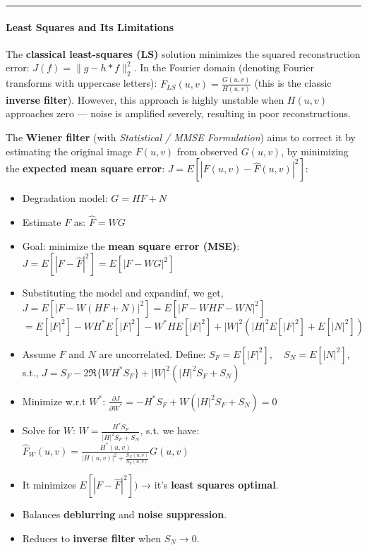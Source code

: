 \documentclass[11pt]{article}
\providecommand{\tightlist}{%
      \setlength{\itemsep}{0pt}\setlength{\parskip}{0pt}}
\begin{document}
\begin{center}\rule{0.5\linewidth}{0.5pt}\end{center}

\hypertarget{least-squares-and-its-limitations}{%
\paragraph{\texorpdfstring{\textbf{Least Squares and Its
Limitations}}{Least Squares and Its Limitations}}\label{least-squares-and-its-limitations}}

The \textbf{classical least-squares (LS)} solution minimizes the squared
reconstruction error: \(J(f) = \| g - h * f \|_2^2\). In the Fourier
domain (denoting Fourier transforms with uppercase letters):
\(F_{LS}(u,v) = \frac{G(u,v)}{H(u,v)}\) (this is the classic
\textbf{inverse filter}). However, this approach is highly unstable when
\(H(u,v)\) approaches zero --- noise is amplified severely, resulting in
poor reconstructions.

The \textbf{Wiener filter} (with \emph{Statistical / MMSE Formulation})
aims to correct it by estimating the original image \(F(u,v)\) from
observed \(G(u,v)\), by minimizing the \textbf{expected mean square
error}: \(J = E[|F(u,v) - \hat{F}(u,v)|^2]\):

\begin{itemize}
\tightlist
\item
  Degradation model: \(G = H F + N\)
\item
  Estimate \(F\) as: \(\hat{F} = WG\)
\item
  Goal: minimize the \textbf{mean square error (MSE)}:
  \(J = E[|F - \hat{F}|^2] = E[|F - W G|^2]\)
\item
  Substituting the model and expandinf, we get,
  \(J = E[|F - W(HF + N)|^2] = E[|F - WHF - WN|^2]\)
  \(= E[|F|^2] - W H^* E[|F|^2] - W^* H E[|F|^2] + |W|^2 (|H|^2 E[|F|^2] + E[|N|^2])\)
\item
  Assume \(F\) and \(N\) are uncorrelated. Define:
  \(S_F = E[|F|^2], \quad S_N = E[|N|^2]\), s.t.,
  \(J = S_F - 2 \Re\{W H^* S_F\} + |W|^2 (|H|^2 S_F + S_N)\)
\item
  Minimize w.r.t \(W^*\):
  \(\frac{\partial J}{\partial W^*}= -H^* S_F + W (|H|^2 S_F + S_N) = 0\)
\item
  Solve for \(W\): \(W = \frac{H^* S_F}{|H|^2 S_F + S_N}\), s.t. we
  have:
  \(\boxed{\hat{F}_{W}(u,v) = \frac{H^*(u,v)}{|H(u,v)|^2 + \frac{S_N(u,v)}{S_F(u,v)}}G(u,v)}\)
\item
  It minimizes \(E[|F - \hat{F}|^2] )\) → it's \textbf{least squares
  optimal}.
\item
  Balances \textbf{deblurring} and \textbf{noise suppression}.
\item
  Reduces to \textbf{inverse filter} when \(S_N \to 0\).
\end{itemize}
\end{document}
